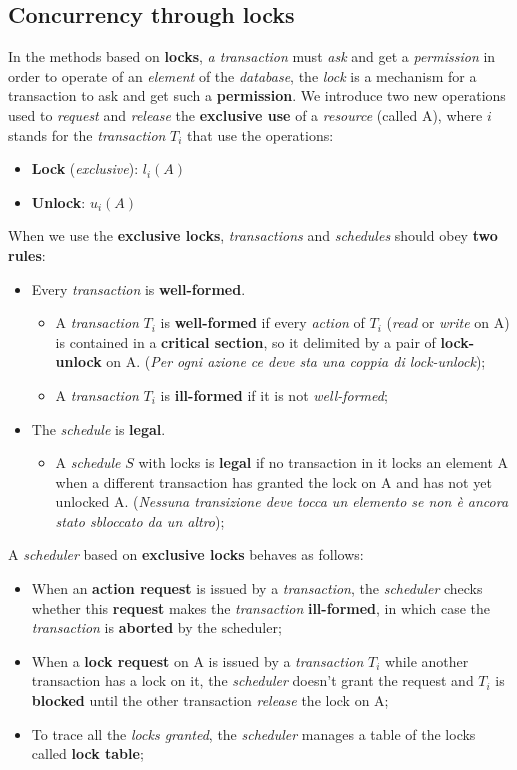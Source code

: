 \documentclass{article}
\begin{document}
\subsection{Concurrency through locks}
In the methods based on \textbf{locks},\emph{ a transaction} must \emph{ask} and get a \emph{permission} in order to operate of an \emph{element} of the \emph{database}, the \emph{lock} is a mechanism for a transaction to ask and get such a \textbf{permission}. We introduce two new operations used to \emph{request} and \emph{release} the \textbf{exclusive use} of a \emph{resource} (called A), where $i$ stands for the \emph{transaction} $T_i$ that use the operations:
\begin{itemize}
\item \textbf{Lock} (\emph{exclusive}): $l_i(A)$
\item \textbf{Unlock}: $u_i(A)$
\end{itemize}
When we use the \textbf{exclusive locks}, \emph{transactions} and \emph{schedules} should obey \textbf{two rules}: 
\begin{itemize}
\item Every \emph{transaction} is \textbf{well-formed}.
\begin{itemize}
\item A \emph{transaction} $T_i$ is \textbf{well-formed} if every \emph{action} of $T_i$ (\emph{read} or \emph{write} on A) is contained in a \textbf{critical section}, so it delimited by a pair of \textbf{lock-unlock} on A. (\emph{Per ogni azione ce deve sta una coppia di lock-unlock});
\item A \emph{transaction} $T_i$ is \textbf{ill-formed} if it is not \emph{well-formed};
\end{itemize}
\item The \emph{schedule} is \textbf{legal}.
\begin{itemize}
\item A \emph{schedule} $S$ with locks is \textbf{legal} if no transaction in it locks an element A when a different transaction has granted the lock on A and has not yet unlocked A. (\emph{Nessuna transizione deve tocca un elemento se non è ancora stato sbloccato da un altro});
\end{itemize}
\end{itemize}
A \emph{scheduler} based on \textbf{exclusive locks} behaves as follows:
\begin{itemize}
\item When an \textbf{action request} is issued by a \emph{transaction}, the \emph{scheduler} checks whether this \textbf{request} makes the \emph{transaction} \textbf{ill-formed}, in which case the \emph{transaction} is \textbf{aborted} by the scheduler;
\item When a \textbf{lock request} on A is issued by a \emph{transaction} $T_i$ while another transaction has a lock on it, the \emph{scheduler} doesn't grant the request and $T_i$ is \textbf{blocked} until the other transaction \emph{release} the lock on A;
\item To trace all the \emph{locks granted}, the \emph{scheduler} manages a table of the locks called \textbf{lock table};
\end{itemize}
\end{document}
